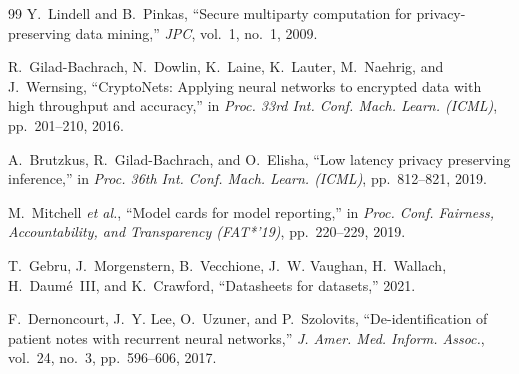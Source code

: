 \documentclass[10pt,conference,a4paper]{IEEEtran}
\begin{document}
\begin{thebibliography}{99}
Y.~Lindell and B.~Pinkas, ``Secure multiparty computation for privacy-preserving data mining,'' \emph{JPC}, vol.~1, no.~1, 2009.

R.~Gilad-Bachrach, N.~Dowlin, K.~Laine, K.~Lauter, M.~Naehrig, and J.~Wernsing, ``CryptoNets: Applying neural networks to encrypted data with high throughput and accuracy,'' in \emph{Proc. 33rd Int. Conf. Mach. Learn. (ICML)}, pp.~201--210, 2016.

A.~Brutzkus, R.~Gilad-Bachrach, and O.~Elisha, ``Low latency privacy preserving inference,'' in \emph{Proc. 36th Int. Conf. Mach. Learn. (ICML)}, pp.~812--821, 2019.

M.~Mitchell \emph{et al.}, ``Model cards for model reporting,'' in \emph{Proc. Conf. Fairness, Accountability, and Transparency (FAT*'19)}, pp.~220--229, 2019.

T.~Gebru, J.~Morgenstern, B.~Vecchione, J.~W. Vaughan, H.~Wallach, H.~Daum{\'e}~III, and K.~Crawford, ``Datasheets for datasets,'' 2021.

F.~Dernoncourt, J.~Y. Lee, O.~Uzuner, and P.~Szolovits, ``De-identification of patient notes with recurrent neural networks,'' \emph{J. Amer. Med. Inform. Assoc.}, vol.~24, no.~3, pp.~596--606, 2017.

\end{thebibliography}
\end{document}
